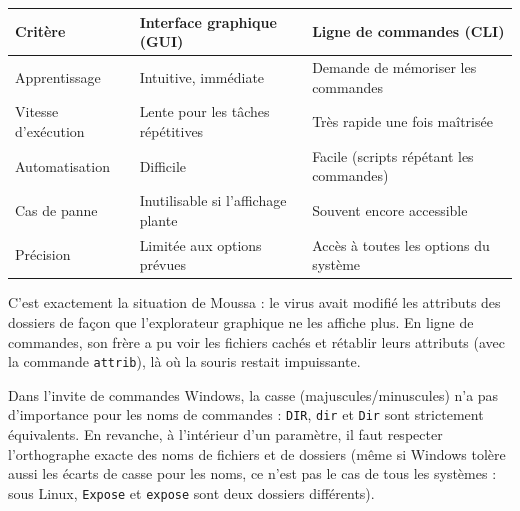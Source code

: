 \documentclass[11pt]{article}
\newcounter{popsec}
\newcounter{popsub}
\newcommand{\courssub}[1]{%
  \stepcounter{popsub}%
  \par\vspace{9pt}\noindent{\popxbold\fontsize{11.5}{13}\selectfont\color{popink}{\color{poporange}\thepopsec.\thepopsub}\hspace{6pt}#1}\par\nopagebreak\vspace{4pt}
}
\begin{document}
\begin{center}
\begin{tabularx}{\linewidth}{|l|X|X|}
\hline
\rowcolor{popblueL} \textbf{Critère} & \textbf{Interface graphique (GUI)} & \textbf{Ligne de commandes (CLI)} \\
\hline
Apprentissage & Intuitive, immédiate & Demande de mémoriser les commandes \\
\hline
Vitesse d'exécution & Lente pour les tâches répétitives & Très rapide une fois maîtrisée \\
\hline
Automatisation & Difficile & Facile (scripts répétant les commandes) \\
\hline
Cas de panne & Inutilisable si l'affichage plante & Souvent encore accessible \\
\hline
Précision & Limitée aux options prévues & Accès à toutes les options du système \\
\hline
\end{tabularx}
\end{center}

C'est exactement la situation de Moussa : le virus avait modifié les attributs des dossiers de façon que l'explorateur graphique ne les affiche plus. En ligne de commandes, son frère a pu voir les fichiers cachés et rétablir leurs attributs (avec la commande \texttt{attrib}), là où la souris restait impuissante.

\begin{propriete}
Dans l'invite de commandes Windows, la casse (majuscules/minuscules) n'a pas d'importance pour les noms de commandes : \texttt{DIR}, \texttt{dir} et \texttt{Dir} sont strictement équivalents. En revanche, à l'intérieur d'un paramètre, il faut respecter l'orthographe exacte des noms de fichiers et de dossiers (même si Windows tolère aussi les écarts de casse pour les noms, ce n'est pas le cas de tous les systèmes : sous Linux, \texttt{Expose} et \texttt{expose} sont deux dossiers différents).
\end{propriete}

\courssub{Premier contact guidé}
\end{document}
